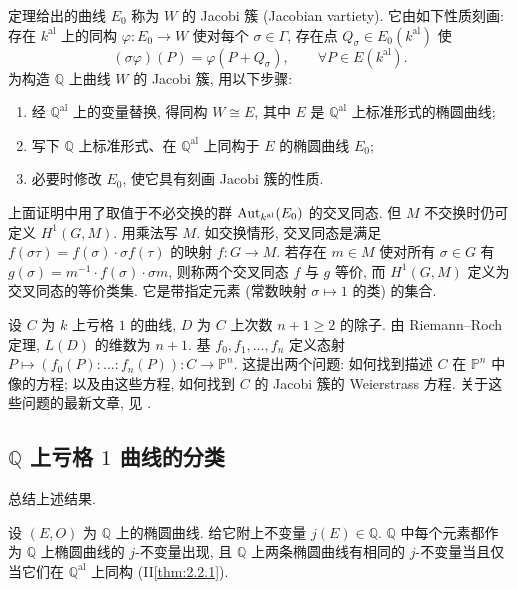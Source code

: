 定理给出的曲线 $E_0$ 称为 $W$ 的 Jacobi 簇 (Jacobian vartiety). 它由如下性质刻画: 存在 $k^{\mathrm{al}}$ 上的同构 $\varphi\colon E_0\to W$ 使对每个 $\sigma\in\Gamma$, 存在点 $Q_\sigma\in E_0(k^{\mathrm{al}})$ 使
\[
(\sigma\varphi)(P) = \varphi(P + Q_\sigma), \qquad \forall P\in E(k^{\mathrm{al}}).
\]
为构造 $\mathbb{Q}$ 上曲线 $W$ 的 Jacobi 簇, 用以下步骤:
\begin{enumerate}[label=\textup{(\alph*)}]
\item 经 $\mathbb{Q}^{\mathrm{al}}$ 上的变量替换, 得同构 $W\cong E$, 其中 $E$ 是 $\mathbb{Q}^{\mathrm{al}}$ 上标准形式的椭圆曲线;
\item 写下 $\mathbb{Q}$ 上标准形式、在 $\mathbb{Q}^{\mathrm{al}}$ 上同构于 $E$ 的椭圆曲线 $E_0$;
\item 必要时修改 $E_0$, 使它具有刻画 Jacobi 簇的性质.
\end{enumerate}

\begin{remark} \label{thm:4.7.20} 
上面证明中用了取值于不必交换的群 $\operatorname{Aut}_{k^{\mathrm{al}}}(E_0)$ 的交叉同态. 但 $M$ 不交换时仍可定义 $H^1(G, M)$. 用乘法写 $M$. 如交换情形, 交叉同态是满足 $f(\sigma\tau) = f(\sigma)\cdot\sigma f(\tau)$ 的映射 $f\colon G\to M$. 若存在 $m\in M$ 使对所有 $\sigma\in G$ 有 $g(\sigma) = m^{-1}\cdot f(\sigma)\cdot\sigma m$, 则称两个交叉同态 $f$ 与 $g$ 等价, 而 $H^1(G, M)$ 定义为交叉同态的等价类集. 它是带指定元素 (常数映射 $\sigma\mapsto 1$ 的类) 的集合.
\end{remark}

\begin{remarkstar}
设 $C$ 为 $k$ 上亏格 $1$ 的曲线, $D$ 为 $C$ 上次数 $n+1\ge 2$ 的除子. 由 Riemann--Roch 定理, $L(D)$ 的维数为 $n+1$. 基 $f_0, f_1, \dots, f_n$ 定义态射 $P\mapsto(f_0(P):\dots:f_n(P))\colon C\to\mathbb{P}^n$. 这提出两个问题: 如何找到描述 $C$ 在 $\mathbb{P}^n$ 中像的方程; 以及由这些方程, 如何找到 $C$ 的 Jacobi 簇的 Weierstrass 方程. 关于这些问题的最新文章, 见 \cite{fisher2018}.
\end{remarkstar}

\subsection*{$\mathbb{Q}$ 上亏格 $1$ 曲线的分类}

总结上述结果.

\begin{aside} \label{thm:4.7.21} 
设 $(E, O)$ 为 $\mathbb{Q}$ 上的椭圆曲线. 给它附上不变量 $j(E)\in\mathbb{Q}$. $\mathbb{Q}$ 中每个元素都作为 $\mathbb{Q}$ 上椭圆曲线的 $j$-不变量出现, 且 $\mathbb{Q}$ 上两条椭圆曲线有相同的 $j$-不变量当且仅当它们在 $\mathbb{Q}^{\mathrm{al}}$ 上同构 (II\ref{thm:2.2.1}).
\end{aside}

